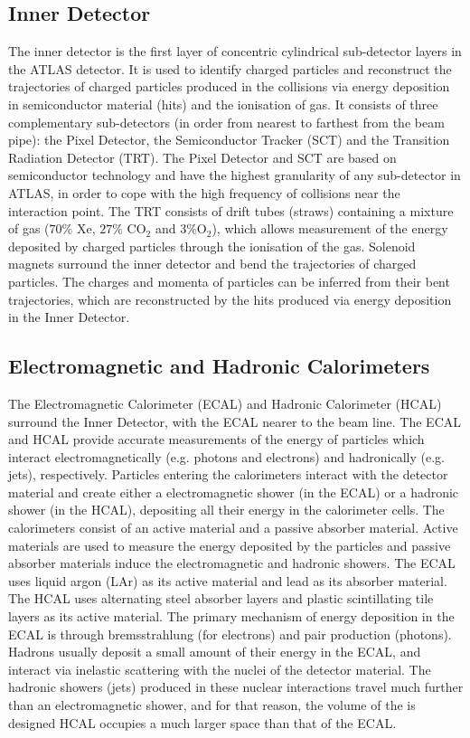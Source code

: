 \subsection{Inner Detector}
The inner detector is the first layer of concentric cylindrical sub-detector layers in the ATLAS detector. It is used to identify charged particles and reconstruct the trajectories of charged particles produced in the collisions via energy deposition in semiconductor material (hits) and the ionisation of gas. It consists of three complementary sub-detectors (in order from nearest to farthest from the beam pipe): the Pixel Detector, the Semiconductor Tracker (SCT) and the Transition Radiation Detector (TRT). The Pixel Detector and SCT are based on semiconductor technology and have the highest granularity of any sub-detector in ATLAS, in order to cope with the high frequency of collisions near the interaction point. The TRT consists of drift tubes (straws) containing a mixture of gas ($70\%$ Xe, $27\%$ CO$_{2}$ and $3\%$O$_{2}$), which allows measurement of the energy deposited by charged particles through the ionisation of the gas. Solenoid magnets surround the inner detector and bend the trajectories of charged particles. The charges and momenta of particles can be inferred from their bent trajectories, which are reconstructed by the hits produced via energy deposition in the Inner Detector.

\subsection{Electromagnetic and Hadronic Calorimeters}
The Electromagnetic Calorimeter (ECAL) and Hadronic Calorimeter (HCAL) surround the Inner Detector, with the ECAL nearer to the beam line. The ECAL and HCAL provide accurate measurements of the energy of particles which interact electromagnetically (e.g. photons and electrons) and hadronically (e.g. jets), respectively. Particles entering the calorimeters interact with the detector material and create either a electromagnetic shower (in the ECAL) or a hadronic shower (in the HCAL), depositing all their energy in the calorimeter cells. The calorimeters consist of an active material and a passive absorber material. Active materials are used to measure the energy deposited by the particles and passive absorber materials induce the electromagnetic and hadronic showers. The ECAL uses liquid argon (LAr) as its active material and lead as its absorber material. The HCAL uses alternating steel absorber layers and plastic scintillating tile layers as its active material. The primary mechanism of energy deposition in the ECAL is through bremsstrahlung (for electrons) and pair production (photons). Hadrons usually deposit a small amount of their energy in the ECAL, and interact via inelastic scattering with the nuclei of the detector material. The hadronic showers (jets) produced in these nuclear interactions travel much further than an electromagnetic shower, and for that reason, the volume of the is designed HCAL occupies a much larger space than that of the ECAL.

